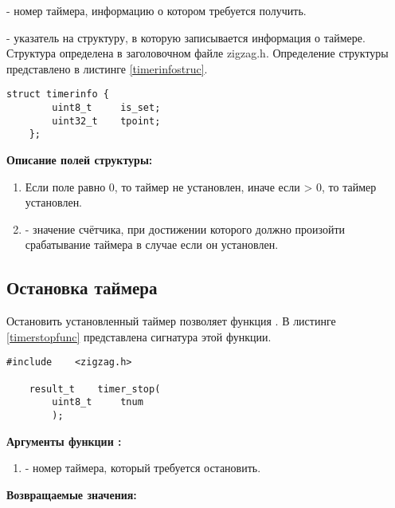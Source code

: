 \begin{enumerate}
{\itshape
\item {} - номер таймера, информацию о котором требуется получить.
\item {} - указатель на структуру, в которую записывается информация о таймере. Структура определена в заголовочном
файле zigzag.h. Определение структуры представлено в листинге \ref{timerinfostruc}.
}

\begin{lstlisting}[caption=Определение структуры \myarg{timerinfo}, label=timerinfostruc]
    struct timerinfo {
        uint8_t     is_set;
        uint32_t    tpoint;
    };
\end{lstlisting}

{\bfseries Описание полей структуры:}

{\itshape
\begin{enumerate}
\item {} Если поле равно 0, то таймер не установлен, иначе если  > 0, то таймер установлен.
\item {} - значение счётчика, при достижении которого должно произойти срабатывание таймера в случае если он установлен.
\end{enumerate}
}
\end{enumerate}

\subsection{Остановка таймера}

    Остановить установленный таймер позволяет функция .
В листинге \ref{timerstopfunc} представлена сигнатура этой функции.

\begin{lstlisting}[caption=\myfunc{timer\_stop()} - остановка таймера, label=timerstopfunc ]
    #include    <zigzag.h>

    result_t    timer_stop(
        uint8_t     tnum
        );
\end{lstlisting}

{\bfseries Аргументы функции :}

{\itshape
\begin{enumerate}
\item {} - номер таймера, который требуется остановить.
\end{enumerate}
}

{\bfseries Возвращаемые значения:}

